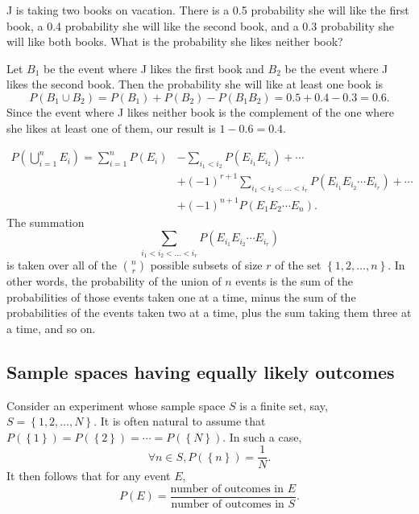 \begin{changebar}
\begin{example}
    J is taking two books on vacation. There is a 0.5 probability she will like the first book, a 0.4 probability she will like the second book, and a 0.3 probability she will like both books. What is the probability she likes neither book?
\end{example}
\begin{solution}
    Let $B_1$ be the event where J likes the first book and $B_2$ be the event where J likes the second book. Then the probability she will like at least one book is \[
        P(B_1 \cup B_2) = P(B_1) + P(B_2) - P(B_1B_2) = 0.5 + 0.4 - 0.3 = 0.6.    
    \] Since the event where J likes neither book is the complement of the one where she likes at least one of them, our result is $1 - 0.6 = 0.4$.
\end{solution}
\end{changebar}

\begin{proposition}
    \[\begin{aligned}
        P\left(\bigcup^n_{i=1} E_i\right) = \sum^n_{i=1} P(E_i) &- \sum_{i_1 < i_2} P(E_{i_1}E_{i_2}) + \cdots \\ &+ (-1)^{r+1}\sum_{i_1 < i_2 < \dots < i_r} P(E_{i_1}E_{i_2}\cdots E_{i_r}) + \cdots \\ &+ (-1)^{n+1}P(E_1E_2\cdots E_n).
    \end{aligned}\]
    The summation \[
        \sum_{i_1 < i_2 < \dots < i_r} P(E_{i_1}E_{i_2}\cdots E_{i_r})
    \] is taken over all of the ${n \choose r}$ possible subsets of size $r$ of the set $\left\{ 1, 2, \dots, n \right\}$. In other words, the probability of the union of $n$ events is the sum of the probabilities of those events taken one at a time, minus the sum of the probabilities of the events taken two at a time, plus the sum taking them three at a time, and so on.
\end{proposition}
\pagebreak
\subsection{Sample spaces having equally likely outcomes}
Consider an experiment whose sample space $S$ is a finite set, say, $S = \left\{ 1, 2, \dots, N \right\}$. It is often natural to assume that $P(\left\{ 1 \right\}) = P(\left\{ 2 \right\}) = \cdots = P(\left\{ N \right\})$. In such a case, \[
    \forall n \in S, P(\left\{ n \right\}) = \frac{1}{N}.
\] It then follows that for any event $E$, \[
    P(E) = \frac{\text{number of outcomes in $E$}}{\text{number of outcomes in $S$}}.    
\]

